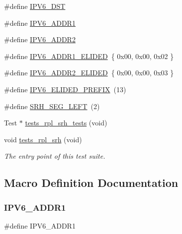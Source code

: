 \begin{DoxyCompactItemize}
\item 
\#define \hyperlink{tests-rpl__srh_8c_ac19383e550a97c6fe09063c574bef166}{I\+P\+V6\+\_\+\+D\+ST}
\item 
\#define \hyperlink{tests-rpl__srh_8c_ad981243fdb96db2756177e0ace8fbe4a}{I\+P\+V6\+\_\+\+A\+D\+D\+R1}
\item 
\#define \hyperlink{tests-rpl__srh_8c_a6c203ee202968d136650b6b79c05a218}{I\+P\+V6\+\_\+\+A\+D\+D\+R2}
\item 
\#define \hyperlink{tests-rpl__srh_8c_a0ec9ea2d2dd433232a294d9acc652dc2}{I\+P\+V6\+\_\+\+A\+D\+D\+R1\+\_\+\+E\+L\+I\+D\+ED}~\{ 0x00, 0x00, 0x02 \}
\item 
\#define \hyperlink{tests-rpl__srh_8c_a64a6e9364d5324d8d2713d2bf21b1ddb}{I\+P\+V6\+\_\+\+A\+D\+D\+R2\+\_\+\+E\+L\+I\+D\+ED}~\{ 0x00, 0x00, 0x03 \}
\item 
\#define \hyperlink{tests-rpl__srh_8c_a48a0a0c6e1706eb7826c078caebd1ba3}{I\+P\+V6\+\_\+\+E\+L\+I\+D\+E\+D\+\_\+\+P\+R\+E\+F\+IX}~(13)
\item 
\#define \hyperlink{tests-rpl__srh_8c_ad6f245073b7e42819a2bdfd15f727a52}{S\+R\+H\+\_\+\+S\+E\+G\+\_\+\+L\+E\+FT}~(2)
\item 
Test $\ast$ \hyperlink{tests-rpl__srh_8c_a71bf138551fde46e379e53ce58f01269}{tests\+\_\+rpl\+\_\+srh\+\_\+tests} (void)
\item 
void \hyperlink{group__unittests_ga48f41dab63963836bd0a692d9137d0a8}{tests\+\_\+rpl\+\_\+srh} (void)
\begin{DoxyCompactList}\small\item\em The entry point of this test suite. \end{DoxyCompactList}\end{DoxyCompactItemize}


\subsection{Macro Definition Documentation}
\mbox{\label{tests-rpl__srh_8c_ad981243fdb96db2756177e0ace8fbe4a}} 
\subsubsection{\texorpdfstring{I\+P\+V6\+\_\+\+A\+D\+D\+R1}{IPV6\_ADDR1}}
{\footnotesize\ttfamily \#define I\+P\+V6\+\_\+\+A\+D\+D\+R1}

